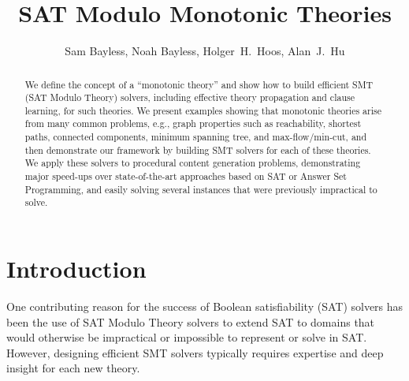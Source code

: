 \documentclass[runningheads]{llncs}
\begin{document}
\mainmatter  




\title{SAT Modulo Monotonic Theories}



\author{Sam Bayless, Noah Bayless, Holger~H.~Hoos, Alan~J.~Hu}


\maketitle


\begin{abstract}

We define the concept of a ``monotonic theory'' and show how to build
efficient SMT (SAT Modulo Theory) solvers, including effective theory
propagation and clause learning, for such theories.
We present examples showing that monotonic theories
arise from many common problems, e.g., graph properties
such as reachability, shortest paths, connected components,
minimum spanning tree, and max-flow/min-cut, and then demonstrate
our framework by building SMT solvers for each of these theories.
We apply these solvers to procedural content generation
problems, demonstrating major speed-ups over state-of-the-art
approaches based on SAT or Answer Set Programming, and easily
solving several instances that were previously impractical to solve.
\end{abstract}




\section{Introduction}\label{intro}

One contributing reason for the success of Boolean satisfiability (SAT) solvers has been the use of SAT Modulo Theory solvers to extend SAT to domains that would otherwise be impractical or impossible to represent or solve in SAT.  However, designing efficient SMT solvers typically requires expertise and deep insight for each new theory.
\end{document}
